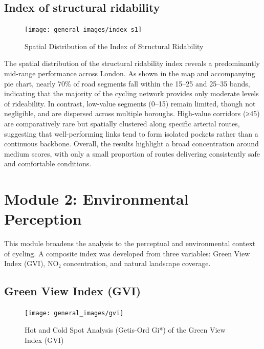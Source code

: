 \documentclass[
  12pt,
  oneside]{book}
\begin{document}
\subsection{Index of structural ridability}\label{index-of-structural-ridability}

\begin{figure}

{\centering \texttt{[image: general\_images/index\_s1]} 

}

\caption{Spatial Distribution of the Index of Structural Ridability}\label{fig:indexs1}
\end{figure}

The spatial distribution of the structural ridability index reveals a predominantly mid-range performance across London. As shown in the map and accompanying pie chart, nearly 70\% of road segments fall within the 15--25 and 25--35 bands, indicating that the majority of the cycling network provides only moderate levels of rideability. In contrast, low-value segments (0--15) remain limited, though not negligible, and are dispersed across multiple boroughs. High-value corridors (≥45) are comparatively rare but spatially clustered along specific arterial routes, suggesting that well-performing links tend to form isolated pockets rather than a continuous backbone. Overall, the results highlight a broad concentration around medium scores, with only a small proportion of routes delivering consistently safe and comfortable conditions.

\section{Module 2: Environmental Perception}\label{module-2-environmental-perception}

This module broadens the analysis to the perceptual and environmental context of cycling. A composite index was developed from three variables: Green View Index (GVI), NO₂ concentration, and natural landscape coverage.

\subsection{Green View Index (GVI)}\label{green-view-index-gvi}

\begin{figure}

{\centering \texttt{[image: general\_images/gvi]} 

}

\caption{Hot and Cold Spot Analysis (Getis-Ord Gi*) of the Green View Index (GVI)}\label{fig:gvi}
\end{figure}
\end{document}
